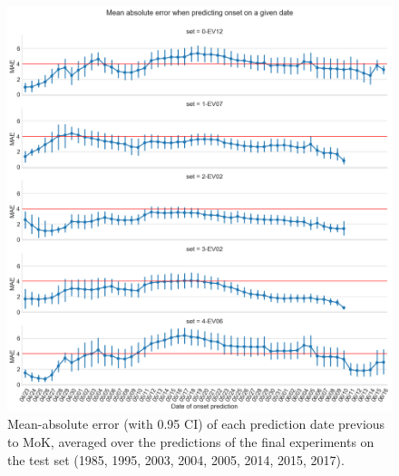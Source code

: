 \begin{figure}[h]
  \centering
  \includegraphics[width=\linewidth]{./99_appendix/img/prediction_accuracy_dates_split.png}
  \caption{Mean-absolute error (with 0.95 CI) of each prediction date previous to MoK, averaged over the predictions of the final experiments on the test set (1985, 1995, 2003, 2004, 2005, 2014, 2015, 2017).}
  \label{apx:prediction_accuracy_dates_ci}
\end{figure}
